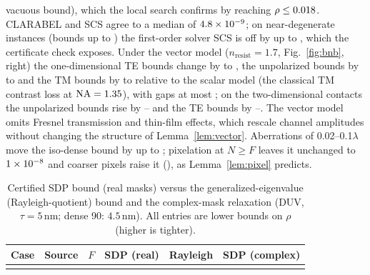 \documentclass[11pt,a4paper]{article}
\newcommand{\SI}[2]{\ensuremath{#1\,\mathrm{#2}}}\newcommand{\SIrange}[3]{\ensuremath{#1\text{--}#2\,\mathrm{#3}}}
\theoremstyle{remark}\newtheorem*{remark}{Remark}
\begin{document}
vacuous bound), which the local search confirms by reaching $\rho\le0.018$. CLARABEL and SCS agree to a median of $4.8\times10^{-9}$; on \verBigDiffN{} near-degenerate instances (bounds up to \verBigDiffBoundMax) the first-order solver SCS is off by up to \verBigDiffMax, which the certificate check exposes. Under the vector model ($n_{\mathrm{resist}}=1.7$, Fig.~\ref{fig:bnb}, right) the one-dimensional TE bounds change by \vecTeLo{} to \vecTeHi{}, the unpolarized bounds by \vecUnLo{} to \vecUnHi{} and the TM bounds by \vecTmLo{} to \vecTmHi{} relative to the scalar model (the classical TM contrast loss at $\mathrm{NA}=1.35$), with gaps at most \vecGapMax; on the two-dimensional contacts the unpolarized bounds rise by \vecTwoDUnLo--\vecTwoDUnHi{} and the TE bounds by \vecTwoDTeLo--\vecTwoDTeHi. The vector model omits Fresnel transmission and thin-film effects, which rescale channel amplitudes without changing the structure of Lemma~\ref{lem:vector}. Aberrations of 0.02--0.1$\lambda$ move the iso-dense bound by up to \abMax; pixelation at $N\ge F$ leaves it unchanged to $1\times10^{-8}$ and coarser pixels raise it (\pixCoarse), as Lemma~\ref{lem:pixel} predicts.
\begin{table}[tbp]\centering\small
\caption{Certified SDP bound (real masks) versus the generalized-eigenvalue (Rayleigh-quotient) bound and the complex-mask relaxation (DUV, $\tau=\SI{5}{nm}$; dense 90: \SI{4.5}{nm}). All entries are lower bounds on $\rho$ (higher is tighter).}\label{tab:rayleigh}
\begin{tabular}{@{}llrrrr@{}}\toprule
Case & Source & $F$ & SDP (real) & Rayleigh & SDP (complex)\\\midrule
\\
\bottomrule\end{tabular}\end{table}

\FloatBarrier
\end{document}
